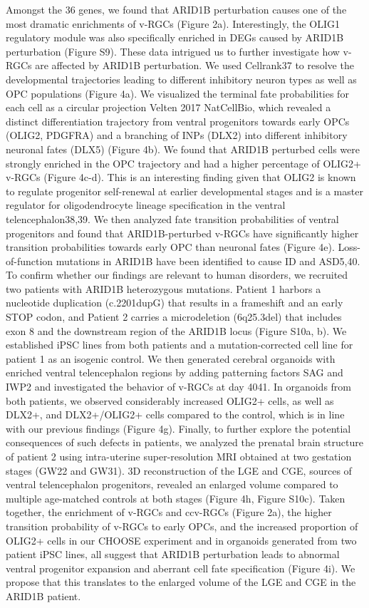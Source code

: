 Amongst the 36 genes, we found that ARID1B perturbation causes one of the most dramatic enrichments of v-RGCs (Figure 2a). Interestingly, the OLIG1 regulatory module was also specifically enriched in DEGs caused by ARID1B perturbation (Figure S9). These data intrigued us to further investigate how v-RGCs are affected by ARID1B perturbation. We used Cellrank37 to resolve the developmental trajectories leading to different inhibitory neuron types as well as OPC populations (Figure 4a). We visualized the terminal fate probabilities for each cell as a circular projection {Velten 2017 NatCellBio}, which revealed a distinct differentiation trajectory from ventral progenitors towards early OPCs (OLIG2, PDGFRA) and a branching of INPs (DLX2) into different inhibitory neuronal fates (DLX5) (Figure 4b). We found that ARID1B perturbed cells were strongly enriched in the OPC trajectory and had a higher percentage of OLIG2+ v-RGCs (Figure 4c-d). This is an interesting finding given that OLIG2 is known to regulate progenitor self-renewal at earlier developmental stages and is a master regulator for oligodendrocyte lineage specification in the ventral telencephalon38,39. We then analyzed fate transition probabilities of ventral progenitors and found that ARID1B-perturbed v-RGCs have significantly higher transition probabilities towards early OPC than neuronal fates (Figure 4e).
Loss-of-function mutations in ARID1B have been identified to cause ID and ASD5,40. To confirm whether our findings are relevant to human disorders, we recruited two patients with ARID1B heterozygous mutations. Patient 1 harbors a nucleotide duplication (c.2201dupG) that results in a frameshift and an early STOP codon, and Patient 2 carries a microdeletion (6q25.3del) that includes exon 8 and the downstream region of the ARID1B locus (Figure S10a, b). We established iPSC lines from both patients and a mutation-corrected cell line for patient 1 as an isogenic control. We then generated cerebral organoids with enriched ventral telencephalon regions by adding patterning factors SAG and IWP2 and investigated the behavior of v-RGCs at day 4041. In organoids from both patients, we observed considerably increased OLIG2+ cells, as well as DLX2+, and DLX2+/OLIG2+ cells compared to the control, which is in line with our previous findings (Figure 4g). Finally, to further explore the potential consequences of such defects in patients, we analyzed the prenatal brain structure of patient 2 using intra-uterine super-resolution MRI obtained at two gestation stages (GW22 and GW31). 3D reconstruction of the LGE and CGE, sources of ventral telencephalon progenitors, revealed an enlarged volume compared to multiple age-matched controls at both stages (Figure 4h, Figure S10c). Taken together, the enrichment of v-RGCs and ccv-RGCs (Figure 2a), the higher transition probability of v-RGCs to early OPCs, and the increased proportion of OLIG2+ cells in our CHOOSE experiment and in organoids generated from two patient iPSC lines, all suggest that ARID1B perturbation leads to abnormal ventral progenitor expansion and aberrant cell fate specification (Figure 4i). We propose that this translates to the enlarged volume of the LGE and CGE in the ARID1B patient.


